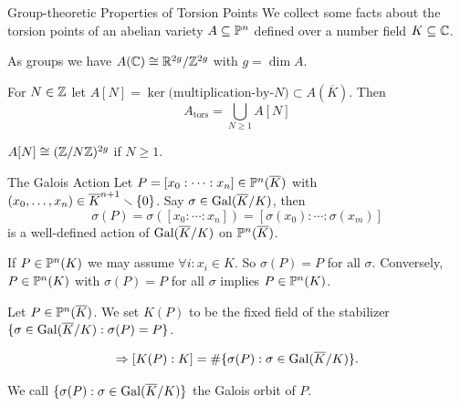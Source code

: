 \documentclass{beamer}
\begin{document}
\begin{frame}{Group-theoretic Properties of Torsion Points} 
  We collect some facts about the torsion points of an
  abelian variety $A\subseteq{\mathbb{P}}^n$ defined over a number field
  $K\subseteq {\mathbb{C}}$.

  As groups we have $A({\mathbb{C}}) \cong {\mathbb{R}}^{2g}/{\mathbb{Z}}^{2g}$ with $g=\dim A$.

  For $N\in{\mathbb{Z}}$ let $A[N] = \ker \text{(multiplication-by-$N$)}
  \subset A(\overline K)$.
  Then
  \begin{equation*}
    A_{\mathrm{tors}} = \bigcup_{N\ge 1} A[N]
  \end{equation*}
  \begin{lemma}
    $A[N] \cong ({\mathbb{Z}}/N{\mathbb{Z}})^{2g}$ if $N\ge 1$.  
  \end{lemma}
\end{frame}


\begin{frame}{The Galois Action}
  Let
  $P=[x_0:\cdots:x_n]\in {\mathbb{P}}^n(\overline{K})$ with  $(x_0,\ldots,x_n) \in
  \overline{K}^{n+1}\smallsetminus\{0\}$.
  Say $\sigma\in \mathrm{Gal}(\overline{K}/K)$, then
  \begin{equation*}
    \sigma(P)=  \sigma([x_0:\cdots:x_n]) = [\sigma(x_0):\cdots:\sigma(x_m)]
  \end{equation*}
  is a well-defined action of $\mathrm{Gal}(\overline{K}/K)$ on ${\mathbb{P}}^n(\overline K)$.

  If $P\in {\mathbb{P}}^n(K)$ we may assume $\forall i:x_i\in K$. So
  $\sigma(P)=P$ for all $\sigma$.
  Conversely, 
  $P\in {\mathbb{P}}^n(K)$ with $\sigma(P)=P$ for all $\sigma$ implies
  $P\in {\mathbb{P}}^n(K)$.

  \begin{definition}
    Let $P\in {\mathbb{P}}^n(\overline K)$. 
    We set $K(P)$ to be the fixed field of the stabilizer
    $\{\sigma\in \mathrm{Gal}(\overline{K}/K) : \sigma(P)=P\}$. 
  \end{definition}


  \begin{equation*}
    \Rightarrow [K(P):K]  = \#\{\sigma(P) : \sigma\in\mathrm{Gal}(\overline{K}/K) \}. 
  \end{equation*}

  We call $\{\sigma(P) : \sigma\in \mathrm{Gal}(\overline{K}/K)\}$ the \alert{Galois
    orbit} of $P$. 
\end{frame}
\end{document}
